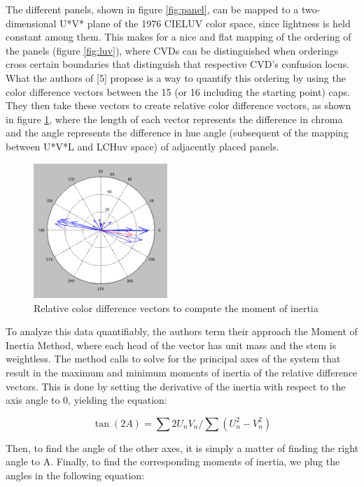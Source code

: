\documentclass[10pt,twocolumn,letterpaper]{article}
\begin{document}
The different panels, shown in figure \ref{fig:panel}, can be mapped to a two-dimensional U*V* plane of the 1976 CIELUV color space, since lightness is held constant among them. This makes for a nice and flat mapping of the ordering of the panels (figure \ref{fig:luv}), where CVDs can be distinguished when orderings cross certain boundaries that distinguish that respective CVD’s confusion locus. What the authors of [5] propose is a way to quantify this ordering by using the color difference vectors between the 15 (or 16 including the starting point) caps.  They then take these vectors to create relative color difference vectors, as shown in figure \ref{fig:compass}, where the length of each vector represents the difference in chroma and the angle represents the difference in hue angle (subsequent of the mapping between U*V*L and LCHuv space) of adjacently placed panels.  

\begin{figure}[h]
  \includegraphics[width=0.45\textwidth]{compass.png}
  \caption{Relative color difference vectors to compute the moment of inertia}
  \label{fig:compass}
\end{figure}

To analyze this data quantifiably, the authors term their approach the Moment of Inertia Method, where each head of the vector has unit mass and the stem is weightless. The method calls to solve for the principal axes of the system that result in the maximum and minimum moments of inertia of the relative difference vectors. This is done by setting the derivative of the inertia with respect to the axis angle to 0, yielding the equation: 

\begin{equation}\label{inertia1}
  \tan(2A) = \sum 2U_nV_n / \sum (U_n^{2} - V_n^{2})
\end{equation}

Then, to find the angle of the other axes, it is simply a matter of finding the right angle to A. 
Finally, to find the corresponding moments of inertia, we plug the angles in the following equation:
\end{document}
